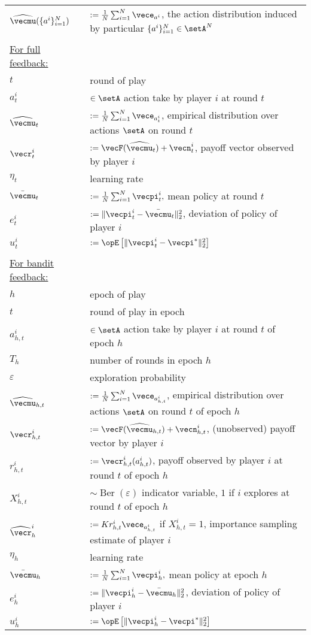 \begin{longtable}{ p{}  p{} }
$\widehat{\vecmu}(\{a^i\}_{i=1}^N)$ & $:= \frac{1}{N} \sum_{i=1}^N \vece_{a^i}$, the action distribution induced by particular $\{a^i\}_{i=1}^N \in \setA^N$ \\
 &  \\ 
\underline{For full feedback:} & \\
$t$ & round of play \\
$a^i_t$ & $\in\setA$ action take by player $i$ at round $t$ \\
$\widehat{\vecmu}_t $ & $:= \frac{1}{N} \sum_{i=1}^N \vece_{a_t^i}$, empirical distribution over actions $\setA$ on round $t$ \\ 
$\vecr^i_t$ & $:= \vecF(\widehat{\vecmu}_t) + \vecn_t^i$, payoff vector observed by player $i$ \\ 
$\eta_t$ & learning rate \\
$ \bar{\vecmu}_t $ & $ := \frac{1}{N} \sum_{i=1}^N \vecpi_t^i,$  mean policy at round $t$\\ 
$e_t^i$ & $:= \|\vecpi^i_t - \bar{\vecmu}_t \|_2^2 $, deviation of policy of player $i$ \\
$u_t^i $ & $:= \Exop\left[\| \vecpi_t^i - \vecpi^* \|_2^2\right]$ \\
 &  \\ 
\underline{For bandit feedback:} & \\
$h$ & epoch of play \\
$t$ & round of play in epoch \\
$a^i_{h,t}$ & $\in\setA$ action take by player $i$ at round $t$ of epoch $h$ \\
$T_h$ & number of rounds in epoch $h$ \\
$\varepsilon$ & exploration probability \\
$\widehat{\vecmu}_{h,t} $ & $:= \frac{1}{N} \sum_{i=1}^N \vece_{a_{h, t}^i}$, empirical distribution over actions $\setA$ on round $t$ of epoch $h$ \\ 
$\vecr^i_{h,t}$ & $:= \vecF(\widehat{\vecmu}_{h,t}) + \vecn_{h,t}^i$, (unobserved) payoff vector by player $i$ \\ 
$r^i_{h,t}$ & $:= \vecr^i_{h,t} (a^i_{h,t})$, payoff observed by player $i$ at round $t$ of epoch $h$ \\
$X_{h,t}^i$ & $\sim \operatorname{Ber}(\varepsilon)$ indicator variable, $1$ if $i$ explores at round $t$ of epoch $h$ \\
$\widehat{\vecr}^i_h $ & $:= K r^i_{h,t}\vece_{a^i_{h,t}}$ if $X_{h,t}^i=1$, importance sampling estimate of player $i$ \\
$\eta_h$ & learning rate \\
$ \bar{\vecmu}_h $ & $ := \frac{1}{N} \sum_{i=1}^N \vecpi_h^i,$  mean policy at epoch $h$\\ 
$e_h^i$ & $:= \|\vecpi^i_h - \bar{\vecmu}_h \|_2^2 $, deviation of policy of player $i$ \\
$u_h^i $ & $:= \Exop\left[\| \vecpi_h^i - \vecpi^* \|_2^2\right]$ \\
\end{longtable}
